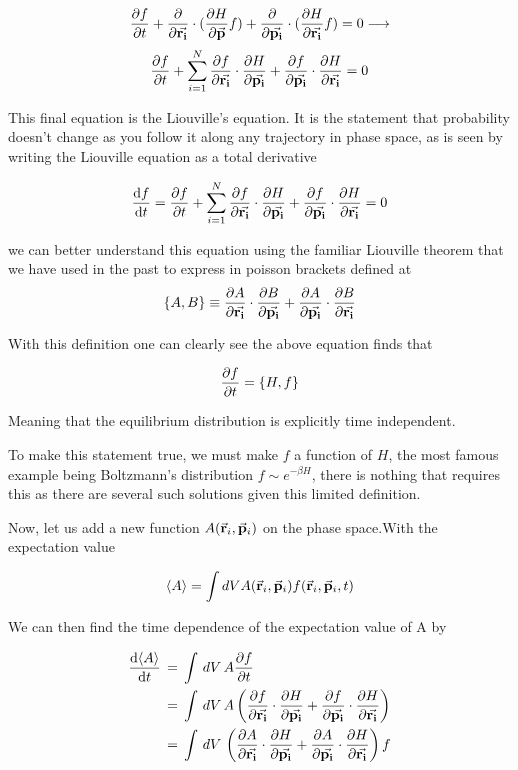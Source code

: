   \[
\pdv{f}{t} +\pdv{}{\va{r_i}} \cdot (\pdv{H}{\va{p}} f) +\pdv{}{\va{p_i}} \cdot (\pdv{H}{\va{r_i}}f) = 0 \longrightarrow
  \]
\[
\pdv{f}{t} + \sum_{i=1}^N \pdv{f}{\va{r_i}} \cdot \pdv{H}{\va{p_i}} + \pdv{f}{\va{p_i}} \cdot \pdv{H}{\va{r_i}} = 0
  \]

This final equation is the Liouville’s equation. It is the statement that probability
doesn’t change as you follow it along any trajectory in phase space, as is seen by
writing the Liouville equation as a total derivative

\[
\dv{f}{t} = \pdv{f}{t} + \sum_{i=1}^N \pdv{f}{\va{r_i}} \cdot \pdv{H}{\va{p_i}} + \pdv{f}{\va{p_i}} \cdot \pdv{H}{\va{r_i}} = 0
  \]

  we can better understand this equation using the familiar Liouville theorem that we have used in the past to express in poisson brackets defined at
\[
\pb{A}{B} \equiv \pdv{A}{\va{r_i}} \cdot \pdv{B}{\va{p_i}} + \pdv{A}{\va{p_i}} \cdot \pdv{B}{\va{r_i}}
  \]

  With this definition one can clearly see the above equation finds that

\[
\pdv{f}{t} = \pb{H}{f}
  \]

  Meaning that the equilibrium distribution is explicitly time independent.

  To make this statement true, we must make $f$ a function of $H$, the most famous example being Boltzmann's distribution $f \sim e^{-\beta H}$, there is nothing that requires this as there are several such solutions given this limited definition.

Now, let us add a new function $A(\va{r}_i,\va{p}_i)$ on the phase space.With the expectation value

\[
\langle A \rangle = \int dV A(\va{r}_i,\va{p}_i) f(\va{r}_i,\va{p}_i, t)
  \]

  We can then find the time dependence of the expectation value of A by

\begin{align}
  \dv{\langle A \rangle}{t} \, &= \, \int \, dV \, A \pdv{f}{t} \\
                               &= \, \int \, dV \, A \left(\pdv{f}{\va{r_i}} \cdot \pdv{H}{\va{p_i}} + \pdv{f}{\va{p_i}} \cdot \pdv{H}{\va{r_i}} \right) \\
                              &= \, \int \, dV \, \left(\pdv{A}{\va{r_i}} \cdot \pdv{H}{\va{p_i}} + \pdv{A}{\va{p_i}} \cdot \pdv{H}{\va{r_i}} \right) f
\end{align}

